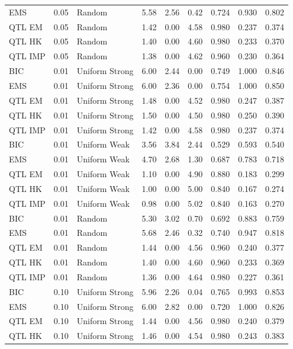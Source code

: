 \documentclass[
  12pt,
]{article}
\begin{document}
\begin{table}
{\begin{tabular}[t]{lrlrrrrrr}
EMS & 0.05 & Random & 5.58 & 2.56 & 0.42 & 0.724 & 0.930 & 0.802\\
QTL EM & 0.05 & Random & 1.42 & 0.00 & 4.58 & 0.980 & 0.237 & 0.374\\
QTL HK & 0.05 & Random & 1.40 & 0.00 & 4.60 & 0.980 & 0.233 & 0.370\\
QTL IMP & 0.05 & Random & 1.38 & 0.00 & 4.62 & 0.960 & 0.230 & 0.364\\
\addlinespace
BIC & 0.01 & Uniform Strong & 6.00 & 2.44 & 0.00 & 0.749 & 1.000 & 0.846\\
EMS & 0.01 & Uniform Strong & 6.00 & 2.36 & 0.00 & 0.754 & 1.000 & 0.850\\
QTL EM & 0.01 & Uniform Strong & 1.48 & 0.00 & 4.52 & 0.980 & 0.247 & 0.387\\
QTL HK & 0.01 & Uniform Strong & 1.50 & 0.00 & 4.50 & 0.980 & 0.250 & 0.390\\
QTL IMP & 0.01 & Uniform Strong & 1.42 & 0.00 & 4.58 & 0.980 & 0.237 & 0.374\\
\addlinespace
BIC & 0.01 & Uniform Weak & 3.56 & 3.84 & 2.44 & 0.529 & 0.593 & 0.540\\
EMS & 0.01 & Uniform Weak & 4.70 & 2.68 & 1.30 & 0.687 & 0.783 & 0.718\\
QTL EM & 0.01 & Uniform Weak & 1.10 & 0.00 & 4.90 & 0.880 & 0.183 & 0.299\\
QTL HK & 0.01 & Uniform Weak & 1.00 & 0.00 & 5.00 & 0.840 & 0.167 & 0.274\\
QTL IMP & 0.01 & Uniform Weak & 0.98 & 0.00 & 5.02 & 0.840 & 0.163 & 0.270\\
\addlinespace
BIC & 0.01 & Random & 5.30 & 3.02 & 0.70 & 0.692 & 0.883 & 0.759\\
EMS & 0.01 & Random & 5.68 & 2.46 & 0.32 & 0.740 & 0.947 & 0.818\\
QTL EM & 0.01 & Random & 1.44 & 0.00 & 4.56 & 0.960 & 0.240 & 0.377\\
QTL HK & 0.01 & Random & 1.40 & 0.00 & 4.60 & 0.960 & 0.233 & 0.369\\
QTL IMP & 0.01 & Random & 1.36 & 0.00 & 4.64 & 0.980 & 0.227 & 0.361\\
\addlinespace
BIC & 0.10 & Uniform Strong & 5.96 & 2.26 & 0.04 & 0.765 & 0.993 & 0.853\\
EMS & 0.10 & Uniform Strong & 6.00 & 2.82 & 0.00 & 0.720 & 1.000 & 0.826\\
QTL EM & 0.10 & Uniform Strong & 1.44 & 0.00 & 4.56 & 0.980 & 0.240 & 0.379\\
QTL HK & 0.10 & Uniform Strong & 1.46 & 0.00 & 4.54 & 0.980 & 0.243 & 0.383\\

\end{tabular}}
\end{table}
\end{document}
